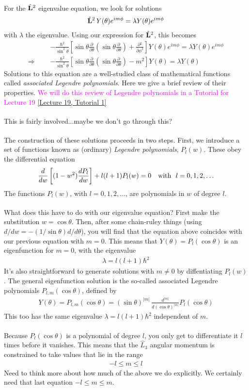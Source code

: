 \documentclass[12pt]{article}
\def\be{\begin{eqnarray}}
\def\ee{\end{eqnarray}}
\newcommand{\nn}{\nonumber}
\newcommand\para{\paragraph{}}
\newcommand{\ppp}[2]{\frac{\partial {#1}}{\partial {#2}}}
\newcommand{\co}{\color{olive}}
\newcommand{\cblue}{\color{blue}}
\newcommand{\alyssa}{\textcolor{magenta}}
\begin{document}
{\para
{\co For the  $\hat{\bf L}^2$ eigenvalue equation, we look for solutions
%
\be  \hat{\bf L}^2 \,Y(\theta) e^{im\phi} = \lambda Y(\theta) e^{im\phi} \nn\ee
%
with $\lambda$ the eigenvalue. Using our expression for $\hat{\bf L}^2$, this becomes
% 
\be
 && -\frac{\hbar^2}{\sin^2\theta} \left[\sin\theta\ppp{}{\theta}\left(\sin\theta\ppp{}{\theta}\right) + \ppp{^2}{\phi^2}\right] Y(\theta)e^{im\phi} = \lambda Y(\theta) e^{im\phi}\nn\\
 \Longrightarrow \ \ \ && -\frac{\hbar^2}{\sin^2\theta} \left[\sin\theta\ppp{}{\theta}\left(\sin\theta\ppp{}{\theta}\right) -m^2\right] Y(\theta) = \lambda Y(\theta) \nn\ee
Solutions to this equation are a well-studied class of mathematical functions called  {\it associated Legendre polynomials}.}  Here we give a brief review of their properties. \alyssa{We will do this review of Legendre polynomials in a Tutorial for Lecture 19} \href{https://drive.google.com/file/d/1xhpN1CYT8GnAk_H8X7QlE6gxoBscc3MD/view?usp=drive_link}{[Lecture 19, Tutorial 1]}


\para
{\cblue This is fairly involved...maybe we don't go through this?

\para
The construction of these solutions proceeds in two steps. First, we introduce a set of functions known as (ordinary) {\it  Legendre polynomials}, $P_l(w)$. These obey the differential equation
%
\be \frac{d}{dw}\left[(1-w^2)\frac{dP_l}{dw}\right] + l(l+1)P_l(w) =0\ \ \ {\rm with}\ \  l=0,1,2,\ldots\nn \ee
%
The functions $P_l(w)$, with $l=0,1,2,\ldots$, are polynomials in $w$ of degree $l$. 

\para
What does this have to do with our eigenvalue equation? First make the substitution $w=\cos\theta$. Then, after some chain-ruley things (using $d/dw = -(1/\sin\theta) d/d\theta$), you will find that the equation above coincides with our previous equation with $m=0$. This means that $Y(\theta) = P_l(\cos\theta)$ is an eigenfunction for $m=0$, with the eigenvalue 
%
 \be \lambda = l(l+1) \hbar^2\nn\ee
 It's also straightforward to generate solutions with $m\neq 0$ by diffentiating $P_l(w)$. The general eigenfunction solution is  the so-called associated Legendre polynomials $P_{l,m}(\cos\theta)$, defined by 
 \be Y(\theta) = P_{l,m}(\cos\theta) = (\sin\theta)^{|m|}\,\frac{d^{|m|}}{d (\cos\theta)^{|m|}} P_l(\cos\theta)\nn\ee
 This too has the same eigenvalue $\lambda = l(l+1)\hbar^2$  independent of $m$. 

\para
Because $P_l(\cos\theta)$ is a polynomial of degree $l$, you only get to differentiate it $l$ times before it vanishes.  This means that the $\hat{L}_3$ angular momentum is constrained to take values that lie in the range
\be -l \leq m \leq l\nn\ee
Need to think more about how much of the above we do explicitly. We certainly need that last equation $-l\leq m\leq m$. }

}
\end{document}
